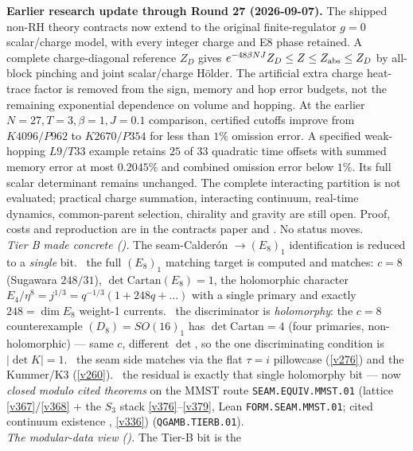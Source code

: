 \par\smallskip\noindent\textbf{Earlier research update through Round 27 (2026-09-07).}
The shipped non-RH theory contracts now extend to the original finite-regulator
$g=0$ scalar/charge model, with every integer charge and E8 phase retained.
A complete charge-diagonal reference $Z_D$ gives
$e^{-48\beta NJ}Z_D\le Z\le Z_{\rm abs}\le Z_D$ by all-block pinching
and joint scalar/charge H\"older. The artificial extra charge heat-trace
factor is removed from the sign, memory and hop error budgets, not the
remaining exponential dependence on volume and hopping.
At the earlier $N=27,T=3,\beta=1,J=0.1$ comparison, certified cutoffs improve
from $K4096/P962$ to $K2670/P354$ for less than $1\%$ omission error.
A specified weak-hopping $L9/T33$ example retains $25$ of $33$ quadratic
time offsets with summed memory error at most $0.2045\%$ and combined
omission error below $1\%$. Its full scalar determinant remains unchanged.
The complete interacting partition is not evaluated; practical charge
summation, interacting continuum, real-time dynamics, common-parent
selection, chirality and gravity are still open. Proof, costs and
reproduction are in the contracts paper and
. No status moves.
\smallskip\\
\noindent\emph{Tier B made concrete ().} The
seam-Calder\'on $\to(E_8)_1$ identification is reduced to a \emph{single} bit. \mE\ the full $(E_8)_1$ matching
target is computed and matches: $c{=}8$ (Sugawara $248/31$), $\det\mathrm{Cartan}(E_8){=}1$, the holomorphic
character $E_4/\eta^8{=}j^{1/3}{=}q^{-1/3}(1{+}248q{+}\dots)$ with a single primary and exactly $248{=}\dim E_8$
weight-1 currents. \mE\ the discriminator is \emph{holomorphy}: the $c{=}8$ counterexample
$(D_8){=}SO(16)_1$ has $\det\mathrm{Cartan}{=}4$ (four primaries, non-holomorphic) --- same $c$, different
$\det$, so the one discriminating condition is $|\det K|{=}1$. \mC\ the seam side matches via the flat
$\tau{=}i$ pillowcase (\vref{v276}) and the Kummer/K3 (\vref{v260}). \mC\ the residual is exactly that single
holomorphy bit --- now \emph{closed modulo cited theorems} on the MMST route \texttt{SEAM.EQUIV.MMST.01}
(lattice \vref{v367}/\vref{v368} $+$ the $S_3$ stack
\vref{v376}--\vref{v379}, Lean \texttt{FORM.SEAM.MMST.01}; cited continuum existence \mO, \vref{v336})
(\texttt{QGAMB.TIERB.01}).
\smallskip\\
\noindent\emph{The modular-data view ().} The Tier-B bit is the
